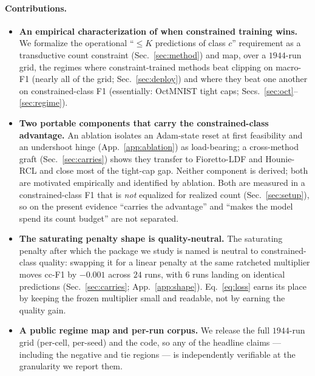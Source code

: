 \documentclass[10pt]{article}
\begin{document}
\paragraph{Contributions.}
\begin{itemize}\itemsep2pt
  \item \textbf{An empirical characterization of when constrained training
  wins.} We formalize the operational ``$\le K$ predictions of class $c$''
  requirement as a transductive count constraint (Sec.~\ref{sec:method}) and
  map, over a $1944$-run grid, the regimes where constraint-trained methods
  beat clipping on macro-F1 (nearly all of the grid;
  Sec.~\ref{sec:deploy}) and where they beat one another on
  constrained-class F1 (essentially: OctMNIST tight caps;
  Secs.~\ref{sec:oct}--\ref{sec:regime}).
  \item \textbf{Two portable components that carry the constrained-class advantage.}
  An ablation isolates an Adam-state reset at first feasibility and an
  undershoot hinge (App.~\ref{app:ablation}) as load-bearing;
  a cross-method graft (Sec.~\ref{sec:carries}) shows they transfer to
  Fioretto-LDF \citep{fioretto2020lagrangian} and Hounie-RCL
  \citep{hounie2023resilient} and close most of the tight-cap gap. Neither
  component is derived; both are motivated empirically and identified by
  ablation.{ Both are measured in a constrained-class F1 that is
  \emph{not} equalized for realized count (Sec.~\ref{sec:setup}), so on the
  present evidence ``carries the advantage'' and ``makes the model spend its
  count budget'' are not separated.}
  \item \textbf{The saturating penalty shape is quality-neutral.} The
  saturating penalty after which the package we study is named is neutral
  to constrained-class quality: swapping it for a linear penalty at the
  same ratcheted multiplier moves cc-F1 by $-0.001$ across $24$ runs,
  with $6$ runs landing on identical predictions
  (Sec.~\ref{sec:carries}; App.~\ref{app:shape}). Eq.~\eqref{eq:loss}
  earns its place by keeping the frozen multiplier small and readable,
  not by earning the quality gain.
  \item \textbf{A public regime map and per-run corpus.} We release the
  full $1944$-run grid (per-cell, per-seed) and the code, so any of the
  headline claims --- including the negative and tie regions --- is
  independently verifiable at the granularity we report them.
\end{itemize}

\end{document}
